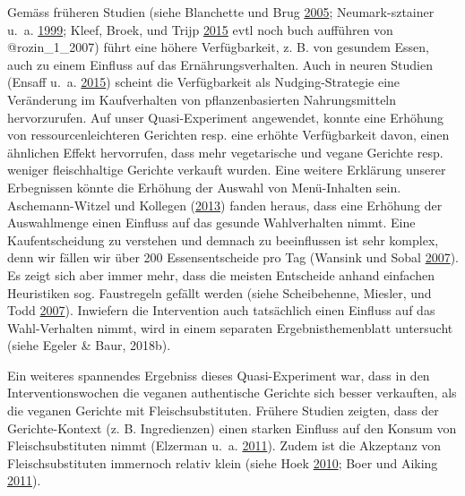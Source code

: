 \documentclass[12pt,ngerman,]{article}
\begin{document}
Gemäss früheren Studien (siehe Blanchette und Brug
\protect\hyperlink{ref-blanchette_determinants_2005}{2005};
Neumark-sztainer u.~a.
\protect\hyperlink{ref-neumark-sztainer_factors_1999}{1999}; Kleef,
Broek, und Trijp \protect\hyperlink{ref-van_kleef_exploiting_2015}{2015}
evtl noch buch aufführen von @rozin\_1\_2007) führt eine höhere
Verfügbarkeit, z. B. von gesundem Essen, auch zu einem Einfluss auf das
Ernährungsverhalten. Auch in neuren Studien (Ensaff u.~a.
\protect\hyperlink{ref-ensaff_food_2015}{2015}) scheint die
Verfügbarkeit als Nudging-Strategie eine Veränderung im Kaufverhalten
von pflanzenbasierten Nahrungsmitteln hervorzurufen. Auf unser
Quasi-Experiment angewendet, konnte eine Erhöhung von
ressourcenleichteren Gerichten resp. eine erhöhte Verfügbarkeit davon,
einen ähnlichen Effekt hervorrufen, dass mehr vegetarische und vegane
Gerichte resp. weniger fleischhaltige Gerichte verkauft wurden. Eine
weitere Erklärung unserer Erbegnissen könnte die Erhöhung der Auswahl
von Menü-Inhalten sein. Aschemann-Witzel und Kollegen
(\protect\hyperlink{ref-aschemann-witzel_effects_2013}{2013}) fanden
heraus, dass eine Erhöhung der Auswahlmenge einen Einfluss auf das
gesunde Wahlverhalten nimmt. Eine Kaufentscheidung zu verstehen und
demnach zu beeinflussen ist sehr komplex, denn wir fällen wir über 200
Essensentscheide pro Tag (Wansink und Sobal
\protect\hyperlink{ref-wansink_mindless_2007}{2007}). Es zeigt sich aber
immer mehr, dass die meisten Entscheide anhand einfachen Heuristiken
sog. Faustregeln gefällt werden (siehe Scheibehenne, Miesler, und Todd
\protect\hyperlink{ref-scheibehenne_fast_2007}{2007}). Inwiefern die
Intervention auch tatsächlich einen Einfluss auf das Wahl-Verhalten
nimmt, wird in einem separaten Ergebnisthemenblatt untersucht (siehe
Egeler \& Baur, 2018b).

\par

Ein weiteres spannendes Ergebniss dieses Quasi-Experiment war, dass in
den Interventionswochen die veganen authentische Gerichte sich besser
verkauften, als die veganen Gerichte mit Fleischsubstituten. Frühere
Studien zeigten, dass der Gerichte-Kontext (z. B. Ingredienzen) einen
starken Einfluss auf den Konsum von Fleischsubstituten nimmt (Elzerman
u.~a. \protect\hyperlink{ref-elzerman_consumer_2011}{2011}). Zudem ist
die Akzeptanz von Fleischsubstituten immernoch relativ klein (siehe Hoek
\protect\hyperlink{ref-hoek_will_2010}{2010}; Boer und Aiking
\protect\hyperlink{ref-de_boer_merits_2011}{2011}).

\par
\end{document}
